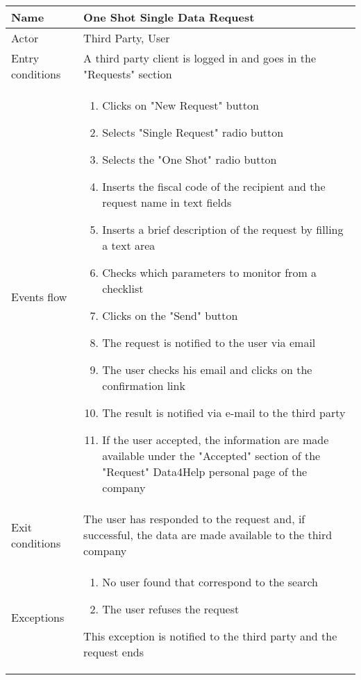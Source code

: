 \newpage
\begin{table}[h!]
\begin{tabular}{|l|p{12cm}|}
\hline
Name             & One Shot Single Data Request \\ \hline
Actor            & Third Party, User \\ \hline
Entry conditions & A third party client is logged in and goes in the "Requests" section\\ \hline
Events flow      & \begin{enumerate}
\item Clicks on "New Request" button
\item Selects "Single Request" radio button
\item Selects the "One Shot" radio button
\item Inserts the fiscal code of the recipient and the request name in text fields
\item Inserts a brief description of the request by filling a text area
\item Checks which parameters to monitor from a checklist
\item Clicks on the "Send" button
\item The request is notified to the user via email
\item The user checks his email and clicks on the confirmation link
\item The result is notified via e-mail to the third party
\item If the user accepted, the information are made available under 
the "Accepted" section of the "Request" Data4Help personal page of the company
\end{enumerate} \\ \hline
Exit conditions  & The user has responded to the request and, if successful, 
the data are made available to the third company \\ \hline
Exceptions & \begin{enumerate}
\item No user found that correspond to the search
\item The user refuses the request
\end{enumerate} This exception is notified to the third party and the request ends \\ \hline
\end{tabular}
\end{table}

